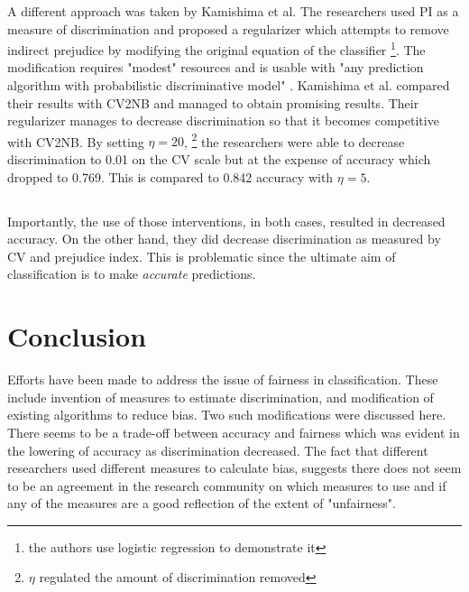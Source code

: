 \documentclass[a4paper, 12pt, notitlepage]{article}
\begin{document}
A different approach was taken by Kamishima et al. The researchers used PI as a measure of discrimination and proposed a regularizer which attempts to remove indirect prejudice by modifying the original equation of the classifier \footnote{the authors use logistic regression to demonstrate it}. The modification requires "modest" resources and is usable with "any prediction algorithm with probabilistic discriminative model" \cite[p.~35]{kamishima2012b}. Kamishima et al. compared their results with CV2NB and managed to obtain promising results. Their regularizer manages to decrease discrimination so that it becomes competitive with CV2NB. By setting $\eta = 20$, \footnote{$\eta$ regulated the amount of discrimination removed} the researchers were able to decrease discrimination to 0.01 on the CV scale but at the expense of accuracy which dropped to 0.769. This is compared to 0.842 accuracy with $\eta = 5$.

\subsection*{}

\vspace{-0.75cm}

Importantly, the use of those interventions, in both cases, resulted in decreased accuracy. On the other hand, they did decrease discrimination as measured by CV and prejudice index. \cite[p.~44]{kamishima2012b} \cite{calders2010} This is problematic since the ultimate aim of classification is to make \emph{accurate} predictions.

\section*{Conclusion}

Efforts have been made to address the issue of fairness in classification. These include invention of measures to estimate discrimination, and modification of existing algorithms to reduce bias. Two such modifications were discussed here. There seems to be a trade-off between accuracy and fairness which was evident in the lowering of accuracy as discrimination decreased. The fact that different researchers used different measures to calculate bias, suggests there does not seem to be an agreement in the research community on which measures to use and if any of the measures are a good reflection of the extent of "unfairness". 

\pagebreak
\end{document}
